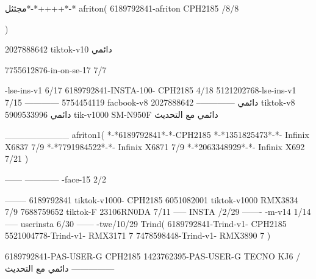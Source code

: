 مجثثل*-*++++*-*
afriton(
6189792841-afriton CPH2185  /8/8

)

2027888642 tiktok-v10
دائمي

7755612876-in-on-se-17 7/7

-lse-ins-v1 6/17
6189792841-INSTA-100- CPH2185 4/18
5121202768-lse-ins-v1 7/15
------------
5754454119 facbook-v8
دائمي
--------------
2027888642 tiktok-v8
دائمي
5909533996 tik-v1000  SM-N950F
دائمي مع التحديث

__________
afriton1(
*-*6189792841*-*-CPH2185
*-*1351825473*-*-  Infinix X6837  7/9
*-*7791984522*-*-  Infinix X6871  7/9
*-*2063348929*-*-  Infinix X692  7/21
)


------
------------
-face-15 2/2

--------
6189792841 tiktok-v1000- CPH2185 
6051082001 tiktok-v1000 RMX3834  7/9
7688759652 tiktok-F 23106RN0DA  7/11
-----
 INSTA /2/29
-------
-m-v14 1/14
-----
userinsta 6/30
------
-twe/10/29
Trind(
6189792841-Trind-v1- CPH2185 
5521004778-Trind-v1- RMX3171 7
7478598448-Trind-v1- RMX3890 7
)


6189792841-PAS-USER-G CPH2185 
1423762395-PAS-USER-G TECNO KJ6  /دائمي مع التحديث
    ---------------

